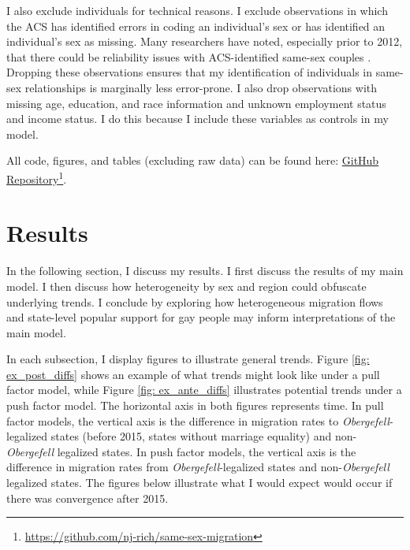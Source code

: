 \documentclass[12pt,letterpaper]{article}
\begin{document}
I also exclude individuals for technical reasons. I exclude observations in which the ACS has identified errors in coding an individual’s sex or has identified an individual’s sex as missing. Many researchers have noted, especially prior to 2012, that there could be reliability issues with ACS-identified same-sex couples \citep{3, 5, 7, 12}. Dropping these observations ensures that my identification of individuals in same-sex relationships is marginally less error-prone. I also drop observations with missing age, education, and race information and unknown employment status and income status. I do this because I include these variables as controls in my model.

All code, figures, and tables (excluding raw data) can be found here: \href{https://github.com/nj-rich/same-sex-migration}{GitHub Repository}\footnote{\url{https://github.com/nj-rich/same-sex-migration}}.

\FloatBarrier
\section{Results}
In the following section, I discuss my results. I first discuss the results of my main model. I then discuss how heterogeneity by sex and region could obfuscate underlying trends. I conclude by exploring how heterogeneous migration flows and state-level popular support for gay people may inform interpretations of the main model.

In each subsection, I display figures to illustrate general trends. Figure \ref{fig: ex_post_diffs} shows an example of what trends might look like under a pull factor model, while Figure \ref{fig: ex_ante_diffs} illustrates potential trends under a push factor model.  The horizontal axis in both figures represents time. In pull factor models, the vertical axis is the difference in migration rates to \textit{Obergefell}-legalized states (before 2015, states without marriage equality) and non-\textit{Obergefell} legalized states. In push factor models, the vertical axis is the difference in migration rates from \textit{Obergefell}-legalized states and non-\textit{Obergefell} legalized states. The figures below illustrate what I would expect would occur if there was convergence after 2015.
\end{document}
